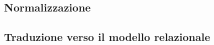 \documentclass[11pt]{article}
\begin{document}
%
%

\subsection{Normalizzazione}
\subsection{Traduzione verso il modello relazionale}
\begin{center}
\end{center}
\end{document}
